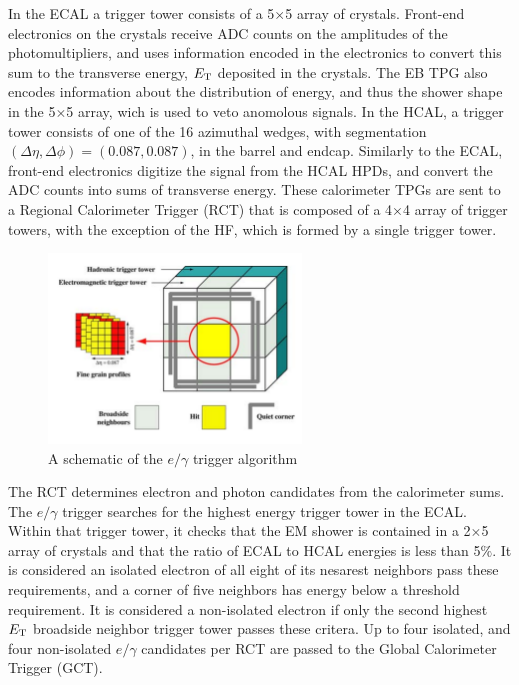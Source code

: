 \par In the ECAL a trigger tower consists of a 5$\times$5 array
of crystals.  Front-end electronics on the crystals receive ADC counts
on the amplitudes of the photomultipliers, and uses information
encoded in the electronics to convert this sum to the transverse
energy, $E_{\mathrm{T}}$ deposited in the crystals.  The EB TPG also encodes
information about the distribution of energy, and thus the shower
shape in the 5$\times$5 array, wich is used to veto anomolous
signals.  In the HCAL, a trigger tower consists of one of the 16
azimuthal wedges, with segmentation $(\Delta\eta, \Delta\phi) =
(0.087, 0.087)$, in the barrel and endcap.  Similarly to the ECAL,
front-end electronics digitize the signal from the HCAL HPDs, and
convert the ADC counts into sums of transverse energy.  These
calorimeter TPGs are sent to a Regional Calorimeter Trigger (RCT) that
is composed of a 4$\times$4 array of trigger towers, with the
exception of the HF, which is formed by a single trigger tower.

\begin{figure}[h]
   \centering
  \includegraphics[width=0.6\textwidth]{Figures/CMS_Diagrams/Trigger__RCT_schematic.pdf}
  \caption{A schematic of the $e/\gamma$ trigger algorithm} \label{fig:tigger_rct_algo}
\end{figure}

\par The RCT determines electron and photon candidates from the
calorimeter sums.  The $e/\gamma$ trigger searches for the highest
energy trigger tower in the ECAL.  Within that trigger tower, it
checks that the EM shower is contained in a 2$\times$5 array of crystals
and that the ratio of ECAL to HCAL energies is less than 5$\%$.  It is
considered an isolated electron of all eight of its nesarest neighbors
pass these requirements, and a corner of five neighbors has energy
below a threshold requirement.  It is considered a non-isolated
electron if only the second highest $E_{\mathrm{T}}$ broadside neighbor trigger
tower passes these critera.  Up to four isolated, and four
non-isolated $e/\gamma$ candidates per RCT are passed to the Global
Calorimeter Trigger (GCT).  

